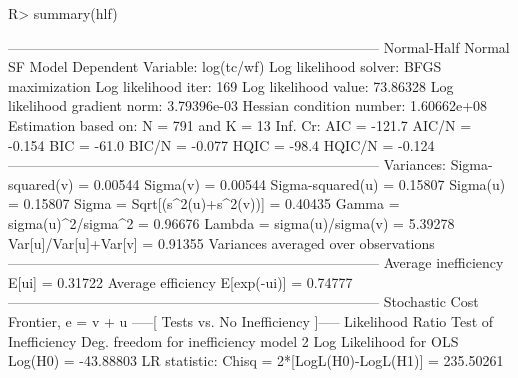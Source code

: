 \documentclass[nojss]{jss}
\begin{document}
\begin{Schunk}
\begin{Sinput}
R> summary(hlf)
\end{Sinput}
\begin{Soutput}
-------------------------------------------------------------------------------- 
Normal-Half Normal SF Model 
Dependent Variable:                                                   log(tc/wf) 
Log likelihood solver:                                         BFGS maximization 
Log likelihood iter:                                                         169 
Log likelihood value:                                                   73.86328 
Log likelihood gradient norm:                                        3.79396e-03 
Hessian condition number:                                            1.60662e+08 
Estimation based on:                                        N =  791 and K =  13 
Inf. Cr:                                         AIC  =  -121.7 AIC/N  =  -0.154 
                                                  BIC  =  -61.0 BIC/N  =  -0.077 
                                                  HQIC =  -98.4 HQIC/N =  -0.124 
-------------------------------------------------------------------------------- 
Variances: Sigma-squared(v)   =                                          0.00544 
           Sigma(v)           =                                          0.00544 
           Sigma-squared(u)   =                                          0.15807 
           Sigma(u)           =                                          0.15807 
Sigma = Sqrt[(s^2(u)+s^2(v))] =                                          0.40435 
Gamma = sigma(u)^2/sigma^2    =                                          0.96676 
Lambda = sigma(u)/sigma(v)    =                                          5.39278 
Var[u]/{Var[u]+Var[v]}        =                                          0.91355 
Variances averaged over observations 
-------------------------------------------------------------------------------- 
Average inefficiency E[ui]     =                                         0.31722 
Average efficiency E[exp(-ui)] =                                         0.74777 
-------------------------------------------------------------------------------- 
Stochastic Cost Frontier, e = v + u 
-----[ Tests vs. No Inefficiency ]-----
Likelihood Ratio Test of Inefficiency
Deg. freedom for inefficiency model                                            2 
Log Likelihood for OLS Log(H0) =                                       -43.88803 
LR statistic:  
Chisq = 2*[LogL(H0)-LogL(H1)]  =                                       235.50261 

\end{Soutput}
\end{Schunk}
\end{document}
